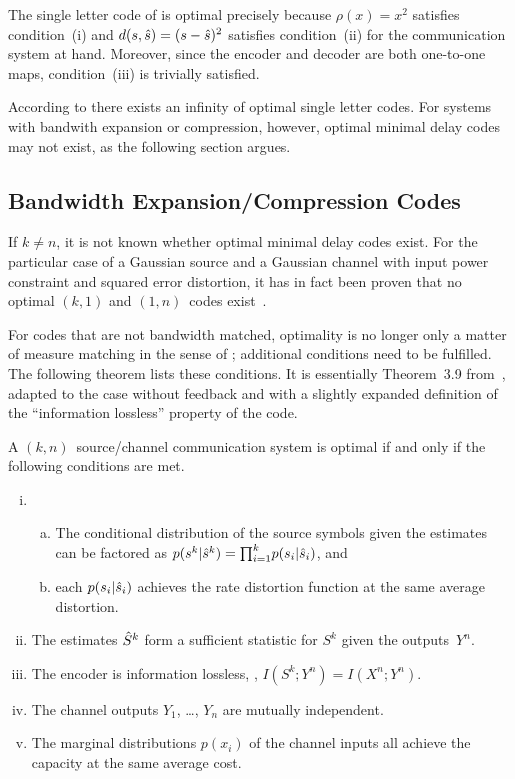 The single letter code of  is optimal precisely because
$\rho(x) = x^2$ satisfies condition~(i) and $d(s,{\hat{s}}) = (s - {\hat{s}})^2$ satisfies
condition~(ii) for the communication system at hand. Moreover, since the encoder
and decoder are both one-to-one maps, condition~(iii) is trivially satisfied.

According to  there exists an infinity of optimal
single letter codes. For systems with bandwith expansion or compression,
however, optimal minimal delay codes may not exist, as the following section
argues.


\subsection{Bandwidth Expansion/Compression Codes}

If $k \ne n$, it is not known whether optimal minimal delay codes exist.  For
the particular case of a Gaussian source and a Gaussian channel with input power
constraint and squared error distortion, it has in fact been proven that no
optimal $(k,1)$ and $(1,n)$~codes exist~\cite{IngberLZF2008}.

For codes that are not bandwidth matched, optimality is no longer only a matter
of measure matching in the sense of ; additional conditions
need to be fulfilled. The following theorem lists these conditions. It is
essentially Theorem~3.9 from~\cite{GastparThesis}, adapted to the case without
feedback and with a slightly expanded definition of the ``information lossless''
property of the code. 

\begin{theorem}
  \label{thm:tcntc1n}
  A $(k, n)$~source/channel communication system is optimal if and only if the
  following conditions are met.
  \begin{enumerate}[(i)]
    \item
      \begin{enumerate}[(a)]
        \item The conditional distribution of the source symbols given the
          estimates can be factored as $p(s^k|{\hat{s}}^k) = {\prod_{i=1}^k} p(s_i|{\hat{s}}_i)$, and
        \item each $p(s_i|{\hat{s}}_i)$ achieves the rate distortion function at the
          same average distortion.
      \end{enumerate}

    \item The estimates ${\hat{S}}^k$ form a sufficient statistic for $S^k$ given the
      outputs~$Y^n$.

    \item The encoder is information lossless, \ie,  $I(S^k; Y^n) =
      I(X^n; Y^n)$. 

    \item The channel outputs $Y_1$, \ldots, $Y_n$ are mutually independent.

    \item The marginal distributions $p(x_i)$ of the channel inputs all achieve
      the capacity at the same average cost.
  \end{enumerate}
\end{theorem}

